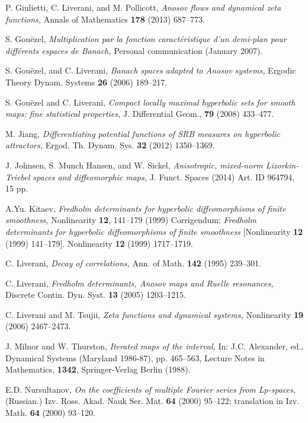 \documentclass[10pt,twoside]{amsart}
\begin{document}
\begin{thebibliography}{KKPW}
  P. Giulietti, C. Liverani, and  M. Pollicott, 
{\it Anosov flows and dynamical zeta functions,} Annals of Mathematics \textbf{178} (2013)  687--773.


S. Gou{\"e}zel, {\it Multiplication par la fonction caract\'{e}ristique d'un demi-plan
pour diff\'{e}rents espaces de Banach,} Personal communication (January 2007).

 
S. Gou{\"e}zel, and C.  Liverani, {\it Banach spaces adapted to {A}nosov systems,}
Ergodic Theory Dynam. Systems  \textbf{26} (2006) 189--217.


 S. Gou{\"e}zel and C. Liverani, 
{\it Compact locally maximal hyperbolic sets for smooth maps: fine  statistical properties,}
J. Differential Geom., \textbf{79} (2008) 433--477.

 M. Jiang, 
{\it Differentiating potential functions of SRB measures on hyperbolic attractors,} 
Ergod. Th. Dynam. Sys. \textbf{32} (2012) 1350--1369.

 J. Johnsen, S. Munch Hansen, and W. Sickel,
{\it Anisotropic, mixed-norm Lizorkin-Triebel spaces and diffeomorphic maps,} J. Funct. Spaces 
(2014)  Art. ID 964794, 15 pp. 


 A.Yu. Kitaev,  {\it Fredholm determinants for hyperbolic diffeomorphisms of finite smoothness,} Nonlinearity 
\textbf{12},  141--179 (1999) Corrigendum: {\it Fredholm determinants for hyperbolic diffeomorphisms of finite smoothness} [Nonlinearity \textbf{12} (1999) 141--179].  Nonlinearity  \textbf{12} (1999)   1717--1719.

 C. Liverani, 
{\it Decay of correlations,}
Ann. of Math.  \textbf{142} (1995) 239--301.

 C. Liverani, 
{\it Fredholm determinants, {A}nosov maps and {R}uelle resonances,} Discrete Contin. Dyn. Syst.
  \textbf{13} (2005) 1203--1215.

  C. Liverani and M. Tsujii, 
 {\it Zeta functions and dynamical systems,}
  Nonlinearity \textbf{19} (2006) 2467--2473.

	J. Milnor and W. Thurston, {\it Iterated maps of the interval,} In: 
   J.C. Alexander, ed., Dynamical Systems (Maryland
1986-87), pp. 465--563,  Lecture Notes in Mathematics, \textbf{1342}, Springer-Verlag Berlin (1988).

 E.D. Nursultanov, 
{\it On the coefficients of multiple Fourier series from Lp-spaces,} (Russian.) Izv. Ross. Akad. Nauk Ser. Mat. 
\textbf{64} (2000) 95--122; translation in
Izv. Math. \textbf{64} (2000) 93--120.


\end{thebibliography}
\end{document}
